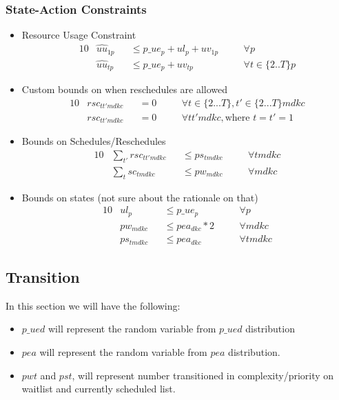 \subsubsection{State-Action Constraints}
\label{state-action constraints}
\begin{itemize}
	
	\item Resource Usage Constraint
	\begin{alignat}{10}
		& \hat{uu}_{1p} 
			&& \le p\_ue_{p} + ul_{p} + uv_{1p} \quad 
			&& \forall p \\
		& \hat{uu}_{tp} 
			&& \le p\_ue_{p} + uv_{tp} \quad
			&& \forall t \in \{ 2..T \}p 
	\end{alignat}
	
	\item Custom bounds on when reschedules are allowed
	\begin{alignat}{10}
		& rsc_{tt'mdkc} && = 0 \quad && \forall t \in \{ 2...T \}, t' \in \{2...T\} mdkc \\
		& rsc_{tt'mdkc} && = 0 \quad && \forall tt'mdkc, \text{where } t=t'=1 
	\end{alignat}  
	
	\item Bounds on Schedules/Reschedules
	\begin{alignat}{10}
		& \sum_{t'} rsc_{tt'mdkc} 	&& \le ps_{tmdkc} \quad  && \forall tmdkc  \\
		& \sum_{t} sc_{tmdkc} 		&& \le pw_{mdkc} \quad 	&& \forall mdkc 
	\end{alignat}  
	
	\item Bounds on states (not sure about the rationale on that)
	\begin{alignat}{10}
		& ul_{p} 	&& \le p\_ue_{p} \quad 			&& \forall p \\
		& pw_{mdkc} 	&& \le pea_{dkc} * 2 \quad 			&& \forall mdkc \\
		& ps_{tmdkc} && \le pea_{dkc} \quad 			&& \forall tmdkc
	\end{alignat}
\end{itemize}

\subsection{Transition}

In this section we will have the following:
\begin{itemize}
	\item $p\_ued$ will represent the random variable from $p\_ued$ distribution 
	\item $pea$ will represent the random variable from $pea$ distribution. 
	\item $pwt$ and $pst$, will represent number transitioned in complexity/priority on waitlist and currently scheduled list.
\end{itemize}


